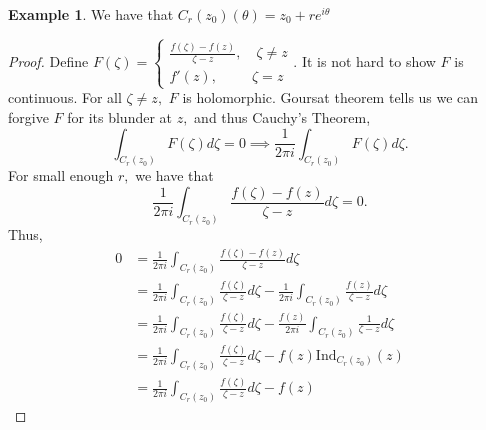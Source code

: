 \documentclass[10pt, oneside]{article}
\newcommand{\Ind}{\text{Ind}}
\theoremstyle{definition}
\newtheorem{exmp}{Example}[section]
\begin{document}
\begin{exmp}
    We have that $C_r(z_0) (\theta) = z_0 + re^{i\theta}$
\end{exmp}
\begin{proof}
    Define $F(\zeta) = \begin{cases}
        \frac{f(\zeta) - f(z)}{\zeta - z}, \quad \zeta \neq z\\
        f'(z), \qquad \;\, \zeta = z
    \end{cases}.$ It is not hard to show $F$ is continuous. For all $\zeta \neq z,$ $F$ is holomorphic. Goursat theorem tells us we can forgive $F$ for its blunder at $z,$ and thus Cauchy's Theorem, 
    \[\int_{C_r(z_0)}F(\zeta) d\zeta = 0 \implies \frac{1}{2\pi i }\int_{C_r(z_0)}F(\zeta) d\zeta.\] For small enough $r,$ we have that 
    \[\frac{1}{2\pi i }\int_{C_r(z_0)}\frac{f(\zeta) - f(z)}{\zeta - z} d\zeta = 0.\] Thus, 
    \begin{align*}
        0 & =\frac{1}{2\pi i }\int_{C_r(z_0)}\frac{f(\zeta) - f(z)}{\zeta - z} d\zeta\\
        &= \frac{1}{2\pi i} \int_{C_r(z_0)}\frac{f(\zeta)}{\zeta - z} d\zeta - \frac{1}{2\pi i} \int_{C_r(z_0)}\frac{f(z)}{\zeta - z} d\zeta\\
        &= \frac{1}{2\pi i} \int_{C_r(z_0)}\frac{f(\zeta)}{\zeta - z} d\zeta - \frac{f(z)}{2\pi i} \int_{C_r(z_0)}\frac{1}{\zeta - z} d\zeta\\
        &= \frac{1}{2\pi i} \int_{C_r(z_0)}\frac{f(\zeta)}{\zeta - z} d\zeta - f(z)\Ind_{C_r(z_0)}(z)\\
        &=\frac{1}{2\pi i} \int_{C_r(z_0)}\frac{f(\zeta)}{\zeta - z} d\zeta - f(z)
    \end{align*}
\end{proof}
\end{document}
